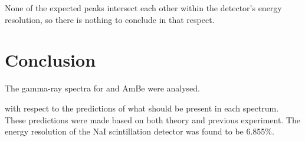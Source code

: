 \documentclass[11pt]{article}
\numberwithin{equation}{section}
\numberwithin{figure}{section}
\numberwithin{table}{section}
\begin{document}
None of the expected peaks intersect each other within the detector's energy resolution, so there is nothing to conclude in that respect. 

\section{Conclusion}\label{sec:Conclusion}
The gamma-ray spectra for  and AmBe were analysed. 


with respect to the predictions of what should be present in each spectrum. These predictions were made based on both theory and previous experiment. The energy resolution of the NaI scintillation detector was found to be 6.855\%.

\newpage
\printbibliography
\end{document}
